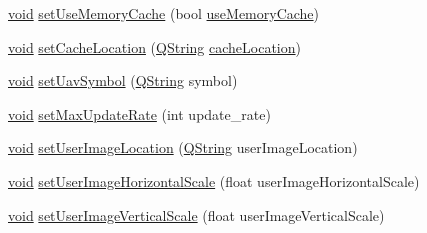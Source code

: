 \begin{DoxyCompactItemize}
\item 
\hyperlink{group___u_a_v_objects_plugin_ga444cf2ff3f0ecbe028adce838d373f5c}{void} \hyperlink{group___o_p_map_plugin_gaf9f7efc1e46ac61b758479e530a3123a}{set\-Use\-Memory\-Cache} (bool \hyperlink{group___o_p_map_plugin_gae936e72883265ab40e9b30a0baaed122}{use\-Memory\-Cache})
\item 
\hyperlink{group___u_a_v_objects_plugin_ga444cf2ff3f0ecbe028adce838d373f5c}{void} \hyperlink{group___o_p_map_plugin_ga1535dec7606615519b068c23a1ca2732}{set\-Cache\-Location} (\hyperlink{group___u_a_v_objects_plugin_gab9d252f49c333c94a72f97ce3105a32d}{\-Q\-String} \hyperlink{group___o_p_map_plugin_ga182bffa488612f55a34e696590887dbf}{cache\-Location})
\item 
\hyperlink{group___u_a_v_objects_plugin_ga444cf2ff3f0ecbe028adce838d373f5c}{void} \hyperlink{group___o_p_map_plugin_gad3440c50dc4df5efc75c2e9c495bd87c}{set\-Uav\-Symbol} (\hyperlink{group___u_a_v_objects_plugin_gab9d252f49c333c94a72f97ce3105a32d}{\-Q\-String} symbol)
\item 
\hyperlink{group___u_a_v_objects_plugin_ga444cf2ff3f0ecbe028adce838d373f5c}{void} \hyperlink{group___o_p_map_plugin_gaf7ae2720705ea7adc0d5ae53aca97ecc}{set\-Max\-Update\-Rate} (int update\-\_\-rate)
\item 
\hyperlink{group___u_a_v_objects_plugin_ga444cf2ff3f0ecbe028adce838d373f5c}{void} \hyperlink{group___o_p_map_plugin_ga4d5dd75bf8d9fc4a61f9b4ccb1073326}{set\-User\-Image\-Location} (\hyperlink{group___u_a_v_objects_plugin_gab9d252f49c333c94a72f97ce3105a32d}{\-Q\-String} user\-Image\-Location)
\item 
\hyperlink{group___u_a_v_objects_plugin_ga444cf2ff3f0ecbe028adce838d373f5c}{void} \hyperlink{group___o_p_map_plugin_ga0e854a0411317eadea17f6982d319157}{set\-User\-Image\-Horizontal\-Scale} (float user\-Image\-Horizontal\-Scale)
\item 
\hyperlink{group___u_a_v_objects_plugin_ga444cf2ff3f0ecbe028adce838d373f5c}{void} \hyperlink{group___o_p_map_plugin_ga90c2b51792e97ee806fe50d8215f3461}{set\-User\-Image\-Vertical\-Scale} (float user\-Image\-Vertical\-Scale)
\end{DoxyCompactItemize}
